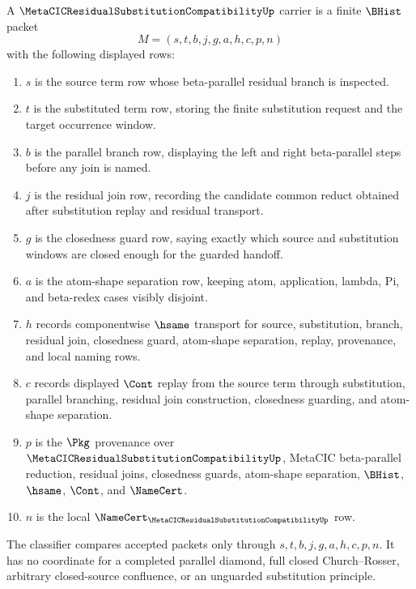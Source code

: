 \begin{definition}
\label{def:metacic-residual-substitution-compatibility-carrier}
A $\MetaCICResidualSubstitutionCompatibilityUp$ carrier is a finite $\BHist$ packet
$$
M=(s,t,b,j,g,a,h,c,p,n)
$$
with the following displayed rows:
\begin{enumerate}
\item $s$ is the source term row whose beta-parallel residual branch is inspected.
\item $t$ is the substituted term row, storing the finite substitution request and the target occurrence window.
\item $b$ is the parallel branch row, displaying the left and right beta-parallel steps before any join is named.
\item $j$ is the residual join row, recording the candidate common reduct obtained after substitution replay and residual transport.
\item $g$ is the closedness guard row, saying exactly which source and substitution windows are closed enough for the guarded handoff.
\item $a$ is the atom-shape separation row, keeping atom, application, lambda, Pi, and beta-redex cases visibly disjoint.
\item $h$ records componentwise $\hsame$ transport for source, substitution, branch, residual join, closedness guard, atom-shape separation, replay, provenance, and local naming rows.
\item $c$ records displayed $\Cont$ replay from the source term through substitution, parallel branching, residual join construction, closedness guarding, and atom-shape separation.
\item $p$ is the $\Pkg$ provenance over $\MetaCICResidualSubstitutionCompatibilityUp$, MetaCIC beta-parallel reduction, residual joins, closedness guards, atom-shape separation, $\BHist$, $\hsame$, $\Cont$, and $\NameCert$.
\item $n$ is the local $\NameCert_{\MetaCICResidualSubstitutionCompatibilityUp}$ row.
\end{enumerate}
The classifier compares accepted packets only through $s,t,b,j,g,a,h,c,p,n$. It has no coordinate for a completed parallel diamond, full closed Church--Rosser, arbitrary closed-source confluence, or an unguarded substitution principle.
\end{definition}

